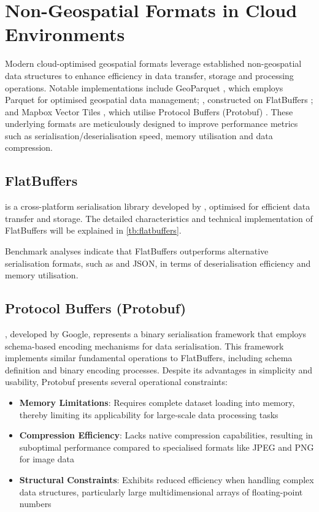 \section{Non-Geospatial Formats in Cloud Environments}
\label{rw:non_geospatial_formats}
Modern cloud-optimised geospatial formats leverage established non-geospatial data structures to enhance efficiency in data transfer, storage and processing operations. Notable implementations include GeoParquet \citep{geoparquet}, which employs Parquet \citep{parquet} for optimised geospatial data management; \citet{flatgeobuf}, constructed on FlatBuffers \citep{flatbuffers}; and Mapbox Vector Tiles \citep{mapbox-vector-tiles}, which utilise Protocol Buffers (Protobuf) \citep{protobuf}. These underlying formats are meticulously designed to improve performance metrics such as serialisation/deserialisation speed, memory utilisation and data compression.

\subsection{FlatBuffers}
\label{rw:non_geospatial_formats:flatbuffers}
\citet{flatbuffers} is a cross-platform serialisation library developed by \citet{google_flatbuffers}, optimised for efficient data transfer and storage. The detailed characteristics and technical implementation of FlatBuffers will be explained in \autoref{tb:flatbuffers}.

Benchmark analyses \citep{flatbuffers_benchmark} indicate that FlatBuffers outperforms alternative serialisation formats, such as \citet{protobuf} and JSON, in terms of deserialisation efficiency and memory utilisation.

\subsection{Protocol Buffers (Protobuf)}
\label{rw:non_geospatial_formats:protobuf}
\citet{protobuf}, developed by Google, represents a binary serialisation framework that employs schema-based encoding mechanisms for data serialisation. This framework implements similar fundamental operations to FlatBuffers, including schema definition and binary encoding processes.
Despite its advantages in simplicity and usability, Protobuf presents several operational constraints:

\begin{itemize}
  \item \textbf{Memory Limitations}: Requires complete dataset loading into memory, thereby limiting its applicability for large-scale data processing tasks
  \item \textbf{Compression Efficiency}: Lacks native compression capabilities, resulting in suboptimal performance compared to specialised formats like JPEG and PNG for image data
  \item \textbf{Structural Constraints}: Exhibits reduced efficiency when handling complex data structures, particularly large multidimensional arrays of floating-point numbers
\end{itemize}


